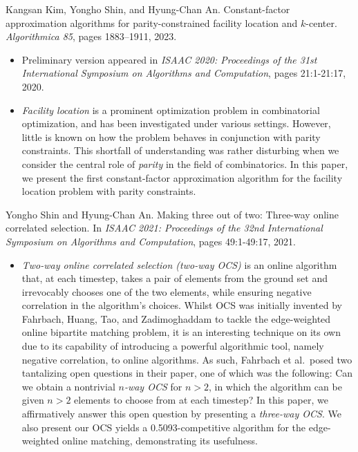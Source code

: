 \documentclass{cv}
\begin{document}
Kangsan Kim, Yongho Shin, and Hyung-Chan An. Constant-factor approximation algorithms for parity-constrained facility location and $k$-center. \emph{Algorithmica 85}, pages 1883–1911, 2023.
\vspace{\killinitspace}
\begin{itemize}
\item Preliminary version appeared in \emph{ISAAC 2020: Proceedings of the 31st International Symposium on Algorithms and Computation}, pages 21:1-21:17, 2020.
\item \emph{Facility location} is a prominent optimization problem in combinatorial optimization, and has been investigated under various settings. However, little is known on how the problem behaves in conjunction with parity constraints. This shortfall of understanding was rather disturbing when we consider the central role of \emph{parity} in the field of combinatorics. In this paper, we present the first constant-factor approximation algorithm for the facility location problem with parity constraints.
\end{itemize}

Yongho Shin and Hyung-Chan An. Making three out of two: Three-way online correlated selection. In \emph{ISAAC 2021: Proceedings of the 32nd International Symposium on Algorithms and Computation}, pages 49:1-49:17, 2021.
\vspace{\killinitspace}
\begin{itemize}
\item \emph{Two-way online correlated selection (two-way OCS)} is an online algorithm that, at each timestep, takes a pair of elements from the ground set and irrevocably chooses one of the two elements, while ensuring negative correlation in the algorithm's choices. Whilst OCS was initially invented by Fahrbach, Huang, Tao, and Zadimoghaddam to tackle the edge-weighted online bipartite matching problem, it is an interesting technique on its own due to its capability of introducing a powerful algorithmic tool, namely negative correlation, to online algorithms. As such, Fahrbach et al.~posed two tantalizing open questions in their paper, one of which was the following: Can we obtain a nontrivial \emph{$n$-way OCS} for $n>2$, in which the algorithm can be given $n>2$ elements to choose from at each timestep? In this paper, we affirmatively answer this open question by presenting a \emph{three-way OCS}. We also present our OCS yields a 0.5093-competitive algorithm for the edge-weighted online matching, demonstrating its usefulness.
\end{itemize}
\end{document}
